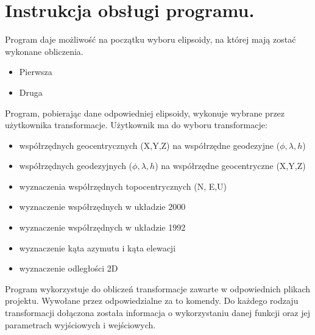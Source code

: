 \section{Instrukcja obsługi programu.}
Program daje możliwość na początku wyboru elipsoidy, na której mają zostać wykonane obliczenia. 
\begin{itemize}
	\item Pierwsza
	\item Druga
\end{itemize}
Program, pobierając dane odpowiedniej elipsoidy, wykonuje wybrane przez użytkownika transformacje. 
\newline
Użytkownik ma do wyboru transformacje:
\begin{itemize}
	\item współrzędnych geocentrycznych (X,Y,Z) na współrzędne geodezyjne ($\phi, \lambda, h$)
	\item współrzędnych geodezyjnych ($\phi, \lambda, h$) na współrzędne geocentryczne (X,Y,Z)
	\item wyznaczenia współrzędnych topocentrycznych (N, E,U)
	\item wyznaczenie współrzędnych w układzie 2000
	\item wyznaczenie współrzędnych w układzie 1992
	\item wyznaczenie kąta azymutu i kąta elewacji
	\item wyznaczenie odległości 2D 
	
\end{itemize}
Program wykorzystuje do obliczeń transformacje zawarte w odpowiednich plikach projektu. Wywołane przez odpowiedzialne za to komendy. 
\newline
Do każdego rodzaju transformacji dołączona została informacja o wykorzystaniu danej funkcji oraz jej parametrach wyjściowych i wejściowych. 


